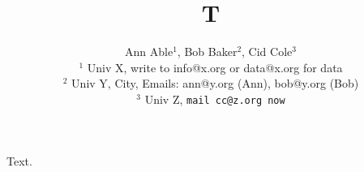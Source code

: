 \documentclass{article}
\begin{document}
\title{T}
\author{Ann Able$^1$, Bob Baker$^2$, Cid Cole$^3$ \\
$^1$ Univ X, write to info@x.org or data@x.org for data \\
$^2$ Univ Y, City, Emails: ann@y.org (Ann), bob@y.org (Bob) \\
$^3$ Univ Z, \texttt{mail cc@z.org now}}
\maketitle
Text.
\end{document}
